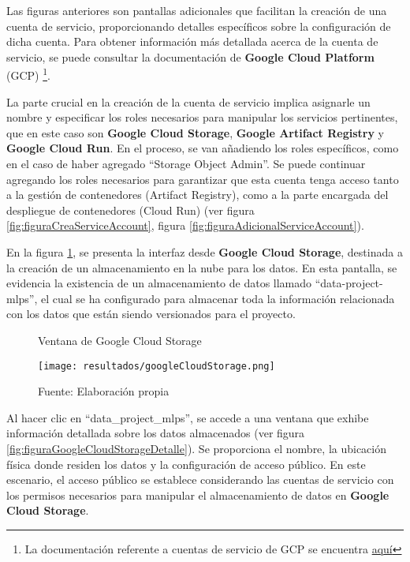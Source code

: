\newpage

Las figuras anteriores son pantallas adicionales que facilitan la creación de una cuenta de servicio, proporcionando detalles específicos sobre la configuración de dicha cuenta. Para obtener información más detallada acerca de la cuenta de servicio, se puede consultar la documentación de \textbf{Google Cloud Platform} (GCP) \footnote{La documentación referente a cuentas de servicio de GCP se encuentra \href{https://cloud.google.com/iam/docs/service-account-overview?hl=es-419}{aquí}}. \newline

La parte crucial en la creación de la cuenta de servicio implica asignarle un nombre y especificar los roles necesarios para manipular los servicios pertinentes, que en este caso son \textbf{Google Cloud Storage}, \textbf{Google Artifact Registry} y \textbf{Google Cloud Run}. En el proceso, se van añadiendo los roles específicos, como en el caso de haber agregado ``Storage Object Admin''. Se puede continuar agregando los roles necesarios para garantizar que esta cuenta tenga acceso tanto a la gestión de contenedores (Artifact Registry), como a la parte encargada del despliegue de contenedores (Cloud Run) (ver figura \ref{fig:figuraCreaServiceAccount}, figura \ref{fig:figuraAdicionalServiceAccount}). \newline

En la figura \ref{fig:figuraGoogleCloudStorage}, se presenta la interfaz desde \textbf{Google Cloud Storage}, destinada a la creación de un almacenamiento en la nube para los datos. En esta pantalla, se evidencia la existencia de un almacenamiento de datos llamado ``data-project-mlps'', el cual se ha configurado para almacenar toda la información relacionada con los datos que están siendo versionados para el proyecto.

\newpage

\begin{figure}[h]
	\centering
	\caption{Ventana de Google Cloud Storage}
	\texttt{[image: resultados/googleCloudStorage.png]}
	\caption*{\footnotesize Fuente: Elaboración propia}
	\label{fig:figuraGoogleCloudStorage}
\end{figure}

Al hacer clic en ``data\_project\_mlps'', se accede a una ventana que exhibe información detallada sobre los datos almacenados (ver figura \ref{fig:figuraGoogleCloudStorageDetalle}). Se proporciona el nombre, la ubicación física donde residen los datos y la configuración de acceso público. En este escenario, el acceso público se establece considerando las cuentas de servicio con los permisos necesarios para manipular el almacenamiento de datos en \textbf{Google Cloud Storage}.

